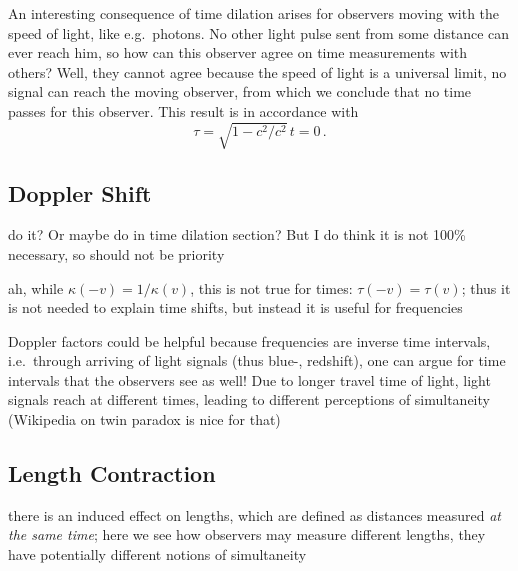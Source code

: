 An interesting consequence of time dilation arises for observers moving with the speed of light, like e.g.~photons. No other light pulse sent from some distance can ever reach him, so how can this observer agree on time measurements with others? Well, they cannot agree because the speed of light is a universal limit, no signal can reach the moving observer, from which we conclude that no time passes for this observer. This result is in accordance with
\begin{equation}
\tau = \sqrt{1 - c^2 / c^2} \, t = 0 \, .
\end{equation}



		\subsection{Doppler Shift}
do it? Or maybe do in time dilation section? But I do think it is not 100\% necessary, so should not be priority


ah, while $\kappa(-v) = 1 / \kappa(v)$, this is not true for times: $\tau(-v) = \tau(v)$; thus it is not needed to explain time shifts, but instead it is useful for frequencies


Doppler factors could be helpful because frequencies are inverse time intervals, i.e.~through arriving of light signals (thus blue-, redshift), one can argue for time intervals that the observers see as well! Due to longer travel time of light, light signals reach at different times, leading to different perceptions of simultaneity (Wikipedia on twin paradox is nice for that)



		\subsection{Length Contraction}
there is an induced effect on lengths, which are defined as distances measured \emph{at the same time}; here we see how observers may measure different lengths, they have potentially different notions of simultaneity





